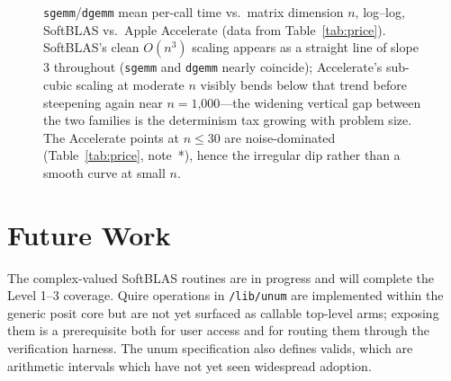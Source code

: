 \documentclass[twoside]{article}
\begin{document}
\begin{figure}[h]
\centering
{}
\caption{\texttt{sgemm}/\texttt{dgemm} mean per-call time vs.\ matrix dimension $n$, log--log, SoftBLAS vs.\ Apple Accelerate (data from Table~\ref{tab:price}).  SoftBLAS's clean $O(n^3)$ scaling appears as a straight line of slope 3 throughout (\texttt{sgemm} and \texttt{dgemm} nearly coincide); Accelerate's sub-cubic scaling at moderate $n$ visibly bends below that trend before steepening again near $n=\text{1,000}$---the widening vertical gap between the two families is the determinism tax growing with problem size.  The Accelerate points at $n\leq\text{30}$ are noise-dominated (Table~\ref{tab:price}, note~*), hence the irregular dip rather than a smooth curve at small $n$.}
\label{fig:price}
\end{figure}

\section{Future Work}

\sloppy
The complex-valued SoftBLAS routines are in progress and will complete the Level 1--3 coverage.  Quire operations in \texttt{/lib/unum} are implemented within the generic posit core but are not yet surfaced as callable top-level arms; exposing them is a prerequisite both for user access and for routing them through the verification harness.  The unum specification also defines valids, which are arithmetic intervals which have not yet seen widespread adoption.
\end{document}

